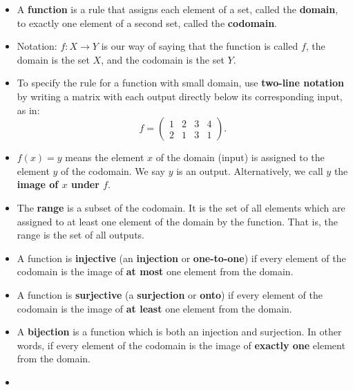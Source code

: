 \documentclass[10pt,]{book}
\newcommand{\terminology}[1]{\textbf{#1}}
\theoremstyle{plain}
\theoremstyle{definition}
\theoremstyle{definition}
\theoremstyle{definition}
\theoremstyle{definition}
\numberwithin{equation}{chapter}
\newcommand{\amp}{&}
\begin{document}
\begin{assemblage}\label{assemblage-28}
\hypertarget{p-1773}{}%
%
\begin{itemize}[label=\textbullet]
\item{}\hypertarget{p-1774}{}%
A \terminology{function} is a rule that assigns each element of a set, called the \terminology{domain}, to exactly one element of a second set, called the \terminology{codomain}.%
\item{}\hypertarget{p-1775}{}%
Notation: \(f:X \to Y\) is our way of saying that the function is called \(f\), the domain is the set \(X\), and the codomain is the set \(Y\).%
\item{}\hypertarget{p-1776}{}%
To specify the rule for a function with small domain, use \terminology{two-line notation} by writing a matrix with each output directly below its corresponding input, as in:%
\begin{equation*}
f = \begin{pmatrix}1 \amp 2 \amp 3 \amp 4 \\ 2 \amp 1 \amp 3 \amp 1 \end{pmatrix}.
\end{equation*}
%
\item{}\hypertarget{p-1777}{}%
\(f(x) = y\) means the element \(x\) of the domain (input) is assigned to the element \(y\) of the codomain. We say \(y\) is an output. Alternatively, we call \(y\) the \terminology{image of \(x\) under \(f\)}.%
\item{}\hypertarget{p-1778}{}%
The \terminology{range} is a subset of the codomain. It is the set of all elements which are assigned to at least one element of the domain by the function. That is, the range is the set of all outputs.%
\item{}\hypertarget{p-1779}{}%
A function is \terminology{injective} (an \terminology{injection} or \terminology{one-to-one}) if every element of the codomain is the image of \terminology{at most} one element from the domain.%
\item{}\hypertarget{p-1780}{}%
A function is \terminology{surjective} (a \terminology{surjection} or \terminology{onto}) if every element of the codomain is the image of \terminology{at least} one element from the domain.%
\item{}\hypertarget{p-1781}{}%
A \terminology{bijection} is a function which is both an injection and surjection. In other words, if every element of the codomain is the image of \terminology{exactly one} element from the domain.%
\item{}\hypertarget{p-1782}{}%

\end{itemize}
\end{assemblage}
\end{document}
